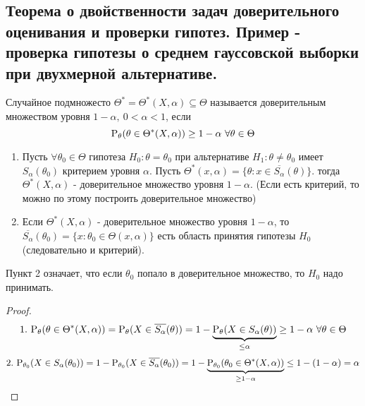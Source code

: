 \newpage
\subsection{Теорема о двойственности задач доверительного оценивания
и проверки гипотез. Пример - проверка гипотезы о среднем гауссовской выборки
при двухмерной альтернативе.}

\begin{definition}
    Случайное подмножесто \(\Theta^*=\Theta^*(X,\alpha)\subseteq\Theta\)
    называется доверительным множеством уровня \(1-\alpha,\ 0<\alpha<1\),
    если
    \[\P_\theta(\theta\in\Theta^*(X,\alpha))\geq 1-\alpha\ \forall\theta\in\Theta\]
\end{definition}
\begin{theorem} \label{th::trusted_set_eq_plausibility_test}
    \begin{enumerate}
        \item Пусть \(\forall\theta_0\in\Theta\) гипотеза \(H_0:\theta=\theta_0\)
        при альтернативе \(H_1:\theta\neq\theta_0\) имеет \(S_\alpha(\theta_0)\)
        критерием уровня \(\alpha\). Пусть \(\Theta^*(x,\alpha) = \{\theta:x\in\overline{S_\alpha}(\theta)\}\).
        тогда \(\Theta^*(X,\alpha)\) - доверительное множество уровня \(1-\alpha\).
        (Если есть критерий, то можно по этому  построить доверительное множество)

        \item Если \(\Theta^*(X,\alpha)\) - доверительное множество уровня \(1-\alpha\),
        то \(\overline{S_\alpha}(\theta_0)=\{x:\theta_0\in\Theta(x,\alpha)\}\)
        есть область принятия гипотезы \(H_0\) (следовательно и критерий).
    \end{enumerate}
\end{theorem}
\begin{remark} \label{hyp::accept_HO}
    Пункт 2 означает, что если \(\theta_0\) попало в доверительное множество,
    то \(H_0\) надо принимать.
\end{remark}
\begin{proof}
    \[1.\ \P_\theta(\theta\in\Theta^*(X,\alpha)) = \P_\theta(X\in\overline{S_\alpha}(\theta)) = 1 - \underbrace{\P_\theta(X\in S_\alpha(\theta))}_{\leq\alpha}\geq 1-\alpha\ \forall\theta\in\Theta\]
    \[2.\ \P_{\theta_0}(X\in S_\alpha(\theta_0)) = 1-\P_{\theta_0}(X\in \overline{S_\alpha}(\theta_0))=
        1-\underbrace{\P_{\theta_0}(\theta_0\in\Theta^*(X,\alpha))}_{\geq 1-\alpha} \leq 1-(1-\alpha) = \alpha\]
\end{proof}
